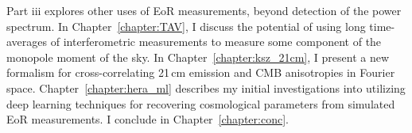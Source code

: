 Part {\sc iii} explores other uses of EoR measurements, beyond detection of the power spectrum. In Chapter~\ref{chapter:TAV}, I discuss the potential of using long time-averages of interferometric measurements to measure some component of the monopole moment of the sky. In Chapter~\ref{chapter:ksz_21cm}, I present a new formalism for cross-correlating 21\,cm emission and CMB anisotropies in Fourier space. Chapter~\ref{chapter:hera_ml} describes my initial investigations into utilizing deep learning techniques for recovering cosmological parameters from simulated EoR measurements. I conclude in Chapter~\ref{chapter:conc}.

